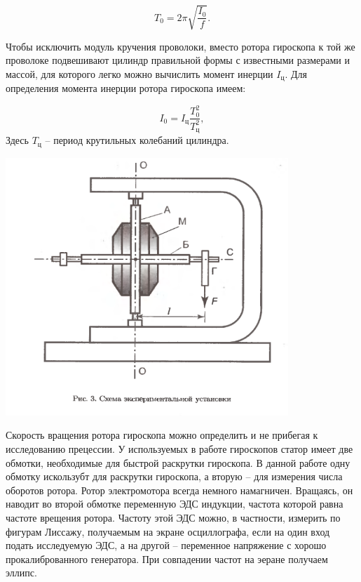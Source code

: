 \documentclass[a4paper, 12pt]{article}
\begin{document}
	\begin{equation}
		T_0 = 2\pi\sqrt{\frac{I_0}{f}}.
	\end{equation}
	
	Чтобы исключить модуль кручения проволоки, вместо ротора гироскопа к той же проволоке подвешивают цилиндр правильной формы с известными размерами и массой, для которого легко можно вычислить момент инерции $I_\text{ц}$. Для определения момента инерции ротора гироскопа имеем:
	
	\begin{equation}
		I_0 = I_\text{ц}\frac{T_0^2}{T_\text{ц}^2},
		\label{moment}
	\end{equation}
	Здесь $T_\text{ц}$ -- период крутильных колебаний цилиндра.\\
	\begin{center}
		\includegraphics[width=0.8\textwidth]{img3.png}
	\end{center}
	
	Скорость вращения ротора гироскопа можно определить и не прибегая к исследованию прецессии. У используемых в работе гироскопов статор имеет две обмотки, необходимые для быстрой раскрутки гироскопа. В данной работе одну обмотку искользубт для раскрутки гироскопа, а вторую -- для измерения числа оборотов ротора. Ротор электромотора всегда немного намагничен. Вращаясь, он наводит во второй обмотке переменную ЭДС индукции, частота которой равна частоте врещения ротора. Частоту этой ЭДС можно, в частности, измерить по фигурам Лиссажу, получаемым на экране осциллографа, если на один вход подать исследуемую ЭДС, а на другой -- переменное напряжение с хорошо прокалиброванного генератора. При совпадении частот на эеране получаем эллипс.
	
\end{document}
